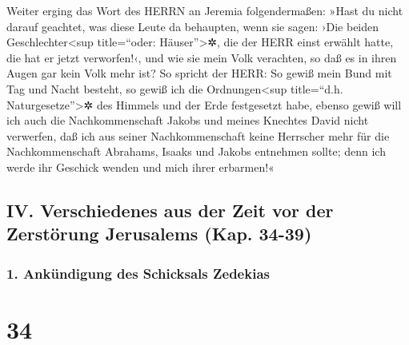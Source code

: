 Weiter erging das Wort des HERRN an Jeremia
folgendermaßen: »Hast du nicht darauf geachtet, was diese
Leute da behaupten, wenn sie sagen: ›Die beiden
Geschlechter\textless sup title=``oder: Häuser''\textgreater✲, die der
HERR einst erwählt hatte, die hat er jetzt verworfen!‹, und wie sie mein
Volk verachten, so daß es in ihren Augen gar kein Volk mehr ist?
So spricht der HERR: So gewiß mein Bund mit Tag und Nacht
besteht, so gewiß ich die Ordnungen\textless sup title=``d.h.
Naturgesetze''\textgreater✲ des Himmels und der Erde festgesetzt habe,
ebenso gewiß will ich auch die Nachkommenschaft Jakobs
und meines Knechtes David nicht verwerfen, daß ich aus seiner
Nachkommenschaft keine Herrscher mehr für die Nachkommenschaft Abrahams,
Isaaks und Jakobs entnehmen sollte; denn ich werde ihr Geschick wenden
und mich ihrer erbarmen!«

\hypertarget{iv.-verschiedenes-aus-der-zeit-vor-der-zerstuxf6rung-jerusalems-kap.-34-39}{%
\subsection{IV. Verschiedenes aus der Zeit vor der Zerstörung Jerusalems
(Kap.
34-39)}\label{iv.-verschiedenes-aus-der-zeit-vor-der-zerstuxf6rung-jerusalems-kap.-34-39}}

\hypertarget{ankuxfcndigung-des-schicksals-zedekias}{%
\subsubsection{1. Ankündigung des Schicksals
Zedekias}\label{ankuxfcndigung-des-schicksals-zedekias}}

\hypertarget{section-33}{%
\section{34}\label{section-33}}

